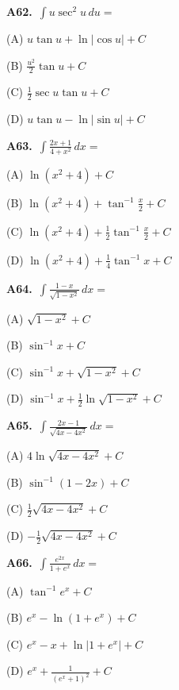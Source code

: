 \documentclass[11pt]{article}
\begin{document}
\bigskip\noindent\textbf{A62.}\ $\displaystyle\int u\sec^2u\,du=$
\begin{list}{}{\setlength{\leftmargin}{3em}\setlength{\labelwidth}{2.5em}\setlength{\itemsep}{0pt}\setlength{\topsep}{2pt}}
\item[(A)] $u\tan u+\ln\lvert\cos u\rvert+C$
\item[(B)] $\frac{u^2}2\tan u+C$
\item[(C)] $\frac12\sec u\tan u+C$
\item[(D)] $u\tan u-\ln\lvert\sin u\rvert+C$
\end{list}

\bigskip\noindent\textbf{A63.}\ $\displaystyle\int \frac{2x+1}{4+x^2}\,dx=$
\begin{list}{}{\setlength{\leftmargin}{3em}\setlength{\labelwidth}{2.5em}\setlength{\itemsep}{0pt}\setlength{\topsep}{2pt}}
\item[(A)] $\ln(x^2+4)+C$
\item[(B)] $\ln(x^2+4)+\tan^{-1}\frac x2+C$
\item[(C)] $\ln(x^2+4)+\frac12\tan^{-1}\frac x2+C$
\item[(D)] $\ln(x^2+4)+\frac14\tan^{-1}x+C$
\end{list}

\bigskip\noindent\textbf{A64.}\ $\displaystyle\int \frac{1-x}{\sqrt{1-x^2}}\,dx=$
\begin{list}{}{\setlength{\leftmargin}{3em}\setlength{\labelwidth}{2.5em}\setlength{\itemsep}{0pt}\setlength{\topsep}{2pt}}
\item[(A)] $\sqrt{1-x^2}+C$
\item[(B)] $\sin^{-1}x+C$
\item[(C)] $\sin^{-1}x+\sqrt{1-x^2}+C$
\item[(D)] $\sin^{-1}x+\frac12\ln\sqrt{1-x^2}+C$
\end{list}

\bigskip\noindent\textbf{A65.}\ $\displaystyle\int \frac{2x-1}{\sqrt{4x-4x^2}}\,dx=$
\begin{list}{}{\setlength{\leftmargin}{3em}\setlength{\labelwidth}{2.5em}\setlength{\itemsep}{0pt}\setlength{\topsep}{2pt}}
\item[(A)] $4\ln\sqrt{4x-4x^2}+C$
\item[(B)] $\sin^{-1}(1-2x)+C$
\item[(C)] $\frac12\sqrt{4x-4x^2}+C$
\item[(D)] $-\frac12\sqrt{4x-4x^2}+C$
\end{list}

\bigskip\noindent\textbf{A66.}\ $\displaystyle\int \frac{e^{2x}}{1+e^x}\,dx=$
\begin{list}{}{\setlength{\leftmargin}{3em}\setlength{\labelwidth}{2.5em}\setlength{\itemsep}{0pt}\setlength{\topsep}{2pt}}
\item[(A)] $\tan^{-1}e^x+C$
\item[(B)] $e^x-\ln(1+e^x)+C$
\item[(C)] $e^x-x+\ln\lvert1+e^x\rvert+C$
\item[(D)] $e^x+\frac1{(e^x+1)^2}+C$
\end{list}
\end{document}
